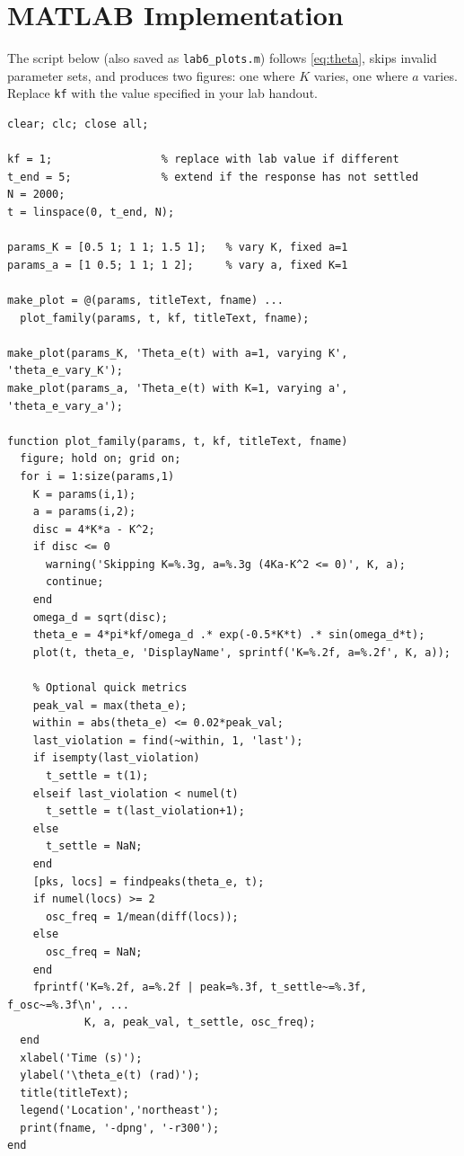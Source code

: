 \documentclass[11pt]{article}
\begin{document}
\section{MATLAB Implementation}
The script below (also saved as \texttt{lab6\_plots.m}) follows \eqref{eq:theta}, skips invalid parameter sets, and produces two figures: one where $K$ varies, one where $a$ varies. Replace \texttt{kf} with the value specified in your lab handout.

\begin{lstlisting}[style=matlab,caption={Phase error for multiple $(K,a)$ pairs.}]
clear; clc; close all;

kf = 1;                 % replace with lab value if different
t_end = 5;              % extend if the response has not settled
N = 2000;
t = linspace(0, t_end, N);

params_K = [0.5 1; 1 1; 1.5 1];   % vary K, fixed a=1
params_a = [1 0.5; 1 1; 1 2];     % vary a, fixed K=1

make_plot = @(params, titleText, fname) ...
  plot_family(params, t, kf, titleText, fname);

make_plot(params_K, 'Theta_e(t) with a=1, varying K', 'theta_e_vary_K');
make_plot(params_a, 'Theta_e(t) with K=1, varying a', 'theta_e_vary_a');

function plot_family(params, t, kf, titleText, fname)
  figure; hold on; grid on;
  for i = 1:size(params,1)
    K = params(i,1);
    a = params(i,2);
    disc = 4*K*a - K^2;
    if disc <= 0
      warning('Skipping K=%.3g, a=%.3g (4Ka-K^2 <= 0)', K, a);
      continue;
    end
    omega_d = sqrt(disc);
    theta_e = 4*pi*kf/omega_d .* exp(-0.5*K*t) .* sin(omega_d*t);
    plot(t, theta_e, 'DisplayName', sprintf('K=%.2f, a=%.2f', K, a));

    % Optional quick metrics
    peak_val = max(theta_e);
    within = abs(theta_e) <= 0.02*peak_val;
    last_violation = find(~within, 1, 'last');
    if isempty(last_violation)
      t_settle = t(1);
    elseif last_violation < numel(t)
      t_settle = t(last_violation+1);
    else
      t_settle = NaN;
    end
    [pks, locs] = findpeaks(theta_e, t);
    if numel(locs) >= 2
      osc_freq = 1/mean(diff(locs));
    else
      osc_freq = NaN;
    end
    fprintf('K=%.2f, a=%.2f | peak=%.3f, t_settle~=%.3f, f_osc~=%.3f\n', ...
            K, a, peak_val, t_settle, osc_freq);
  end
  xlabel('Time (s)');
  ylabel('\theta_e(t) (rad)');
  title(titleText);
  legend('Location','northeast');
  print(fname, '-dpng', '-r300');
end
\end{lstlisting}
\end{document}
